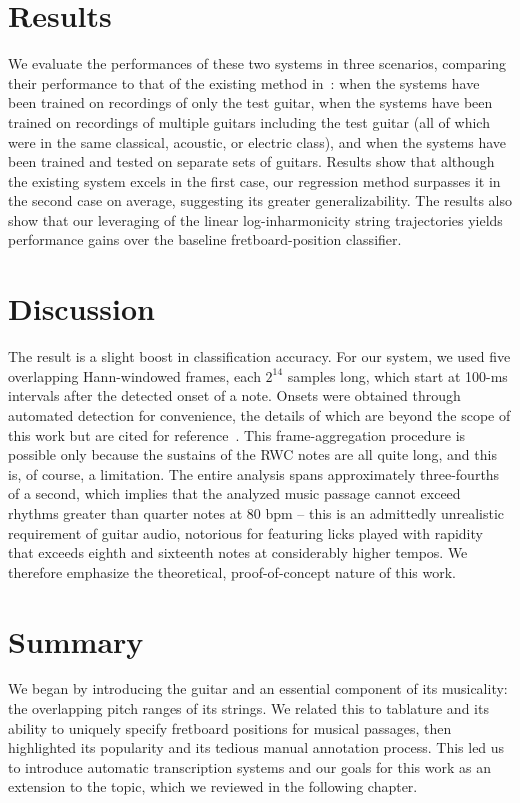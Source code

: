 \documentclass[convention,peer-reviewed]{aesconf}
\begin{document}
\section{Results}  

We evaluate the performances of these two systems in three scenarios, comparing their performance to that of the existing method in~\cite{barbanchoi2012}: when the systems have been trained on recordings of only the test guitar, when the systems have been trained on recordings of multiple guitars including the test guitar (all of which were in the same classical, acoustic, or electric class), and when the systems have been trained and tested on separate sets of guitars. Results show that although the existing system excels in the first case, our regression method surpasses it in the second case on average, suggesting its greater generalizability. The results also show that our leveraging of the linear log-inharmonicity string trajectories yields performance gains over the baseline fretboard-position classifier.

\section{Discussion} 

The result is a slight boost in classification accuracy. For our system, we used five overlapping Hann-windowed frames, each $2^{14}$ samples long, which start at 100-ms intervals after the detected onset of a note. Onsets were obtained through automated detection for convenience, the details of which are beyond the scope of this work but are cited for reference~\cite{bello2005,dixon2006}. This frame-aggregation procedure is possible only because the sustains of the RWC notes are all quite long, and this is, of course, a limitation. The entire analysis spans approximately three-fourths of a second, which implies that the analyzed music passage cannot exceed rhythms greater than quarter notes at 80 bpm -- this is an admittedly unrealistic requirement of guitar audio, notorious for featuring licks played with rapidity that exceeds eighth and sixteenth notes at considerably higher tempos. We therefore emphasize the theoretical, proof-of-concept nature of this work.

\section{Summary} 
We began by introducing the guitar and an essential component of its musicality: the overlapping pitch ranges of its strings. We related this to tablature and its ability to uniquely specify fretboard positions for musical passages, then highlighted its popularity and its tedious manual annotation process. This led us to introduce automatic transcription systems and our goals for this work as an extension to the topic, which we reviewed in the following chapter.
\end{document}
